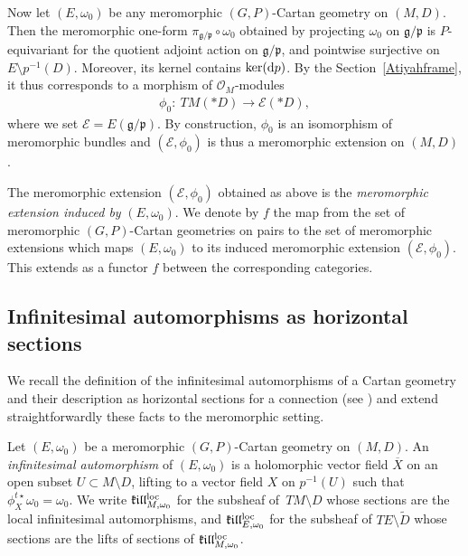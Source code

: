 \documentclass[pdftex]{sigma}
\numberwithin{equation}{section}
\begin{document}
Now let $(E,\omega_0)$ be any meromorphic $(G,P)$-Cartan geometry on $(M,D)$. Then the meromorphic one-form $\pi_{\mathfrak{g}/\mathfrak{p}}\circ \omega_0$ obtained by projecting $\omega_0$ on $\mathfrak{g}/\mathfrak{p}$ is $P$-equivariant for the quotient adjoint action on $\mathfrak{g}/\mathfrak{p}$, and pointwise surjective on $E\setminus p^{-1}(D)$. Moreover, its kernel contains $\ker({\rm d}p)$. By the Section~\ref{Atiyahframe}, it thus corresponds to a morphism of $\mathcal{O}_M$-modules
\begin{gather*}%
 \phi_0 \colon\ TM(* D) \longrightarrow \mathcal{E}(* D),
 \end{gather*}
 where we set $\mathcal{E}=E(\mathfrak{g}/\mathfrak{p})$. By construction, $\phi_0$ is an isomorphism of meromorphic bundles and $(\mathcal{E},\phi_0)$ is thus a meromorphic extension on $(M,D)$.

\begin{Definition}\label{fonct} The meromorphic extension $(\mathcal{E},\phi_0)$ obtained as above is the \textit{meromorphic extension induced by} $(E,\omega_0)$. We denote by $f$ the map from the set of meromorphic $(G,P)$-Cartan geometries on pairs to the set of meromorphic extensions which maps $(E,\omega_0)$ to its induced meromorphic extension $(\mathcal{E},\phi_0)$. This extends as a functor $f$ between the corresponding categories. \end{Definition} %

\subsection{Infinitesimal automorphisms as horizontal sections}
We recall the definition of the infinitesimal automorphisms of a Cartan geometry and their description as horizontal sections for a connection (see \cite[Lemma 1.5.12]{Cap}) and extend straightforwardly these facts to the meromorphic setting.

\begin{Definition}\label{kill} Let $(E,\omega_0)$ be a meromorphic $(G,P)$-Cartan geometry on $(M,D)$. An \textit{infinitesimal automorphism} of $(E,\omega_0)$ is a holomorphic vector field $\overline{X}$ on an open subset $U\subset M\setminus D$, lifting to a vector field $X$ on $p^{-1}(U)$ such that $\phi_X^{t \star} \omega_0 = \omega_0$. We write $\mathfrak{k}\mathfrak{i}\mathfrak{l}\mathfrak{l}^{\rm loc}_{M,\omega_0}$ for the subsheaf of~$TM\setminus D$ whose sections are the local infinitesimal automorphisms, and $\mathfrak{k}\mathfrak{i}\mathfrak{l}\mathfrak{l}^{\rm loc}_{E,\omega_0}$ for the subsheaf of $TE\setminus \tilde{D}$ whose sections are the lifts of sections of $\mathfrak{k}\mathfrak{i}\mathfrak{l}\mathfrak{l}^{\rm loc}_{M,\omega_0}$. \end{Definition}
\end{document}
